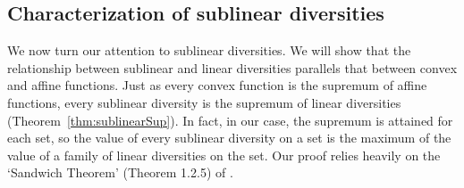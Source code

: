 \documentclass[11pt]{article}
\begin{document}
\subsection{Characterization of sublinear diversities} \label{subsec:char_sublinear}

We now turn our attention to sublinear diversities. We will show that the relationship between sublinear and linear diversities parallels that between convex and affine functions. Just as every convex function is the supremum of affine functions, every sublinear diversity is the supremum of linear diversities (Theorem~\ref{thm:sublinearSup}). In fact, in our case, the supremum is attained for each set,  so the value of every sublinear diversity on a set is the maximum of the value of  a family of linear diversities on the set. Our proof 
relies heavily on the `Sandwich Theorem' (Theorem 1.2.5) of \cite{FuchssteinerLusky81convex}.

 
\end{document}
